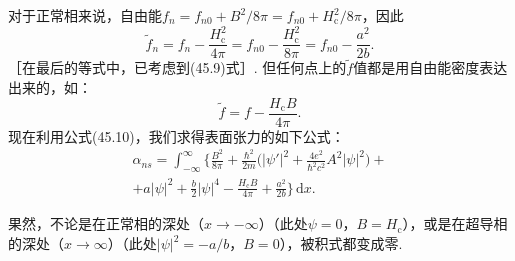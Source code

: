 对于正常相来说，自由能$f_n=f_{n0}+B^2/8\pi=f_{n0}+H_{\mathrm{c}}^2/8\pi$，因此
\begin{equation*}
\tilde{f}_n=f_n-\frac{H_{\mathrm{c}}^2}{4\pi}=f_{n0}-\frac{H_{\mathrm{c}}^2}{8\pi}=f_{n0}-\frac{a^2}{2b}.
\end{equation*}
［在最后的等式中，已考虑到(45.9)式］. 但任何点上的$\tilde{f}$值都是用自由能密度表达出来的，如：
\begin{equation*}
\tilde{f}=f-\frac{H_{\mathrm{c}}B}{4\pi}.
\end{equation*}
现在利用公式(45.10)，我们求得表面张力的如下公式：
\begin{equation}
\begin{aligned}
\alpha_{ns}=\int_{-\infty}^{\infty}\Biggl\{\frac{B^2}{8\pi}
+\frac{\hbar^2}{2m}\biggl(|\psi'|^2+\frac{4e^2}{\hbar^2c^2}A^2|\psi|^2\biggr)+{}\\
+a|\psi|^2+\frac{b}{2}|\psi|^4-\frac{H_{\mathrm{c}}B}{4\pi}+\frac{a^2}{2b}\Biggr\}\,\mathrm{d}x.
\end{aligned}
\end{equation}

果然，不论是在正常相的深处（$x\to-\infty$）（此处$\psi=0$，$B=H_{\mathrm{c}}$），或是在超导相的深处（$x\to\infty$）（此处$|\psi|^2=-a/b$，$B=0$），被积式都变成零.

